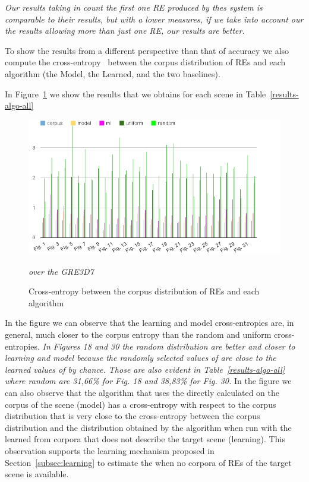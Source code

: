 \textit{Our results taking in count the first one RE produced by thes system is comparable to their results, but with a lower measures, if we take into account our the results allowing more than just one RE, our results are better.}

To show the results from a different perspective than that of accuracy we also compute the cross-entropy~\cite{juraksky:spee08} between the corpus distribution of REs and each algorithm (the Model, the Learned, and the two baselines).    


In Figure~\ref{Entropy} we show the results that we obtains for each scene in Table~\ref{results-algo-all} 

\begin{figure}[h!]
\begin{center}
\includegraphics[width=.9\textwidth]{images/entropyComplete.jpg}
\end{center}
\vspace*{-2em}
\caption{Cross-entropy between the corpus distribution of REs and each algorithm} \textit{over the GRE3D7}\label{Entropy}
\end{figure}

In the figure we can observe that the learning and model cross-entropies are, in general, much closer to the corpus entropy than the random and uniform cross-entropies. \textit{In Figures 18 and 30 the random distribution are better and closer to learning and model because the randomly selected values of \puse are close to the learned values of \puse by chance. Those are also evident in Table~\ref{results-algo-all} where random are 31,66\% for Fig. 18 and 38,83\% for Fig. 30.}
In the figure we can also observe that the algorithm that uses the \puse directly calculated on the corpus of the scene (model) has a cross-entropy with respect to the corpus distribution that is very close to the cross-entropy between the corpus distribution and the distribution obtained by the algorithm when run with the \puse learned from corpora that does not describe the target scene (learning). This observation supports the learning mechanism proposed in Section~\ref{subsec:learning} to estimate the \puse when no corpora of REs of the target scene is available. 
